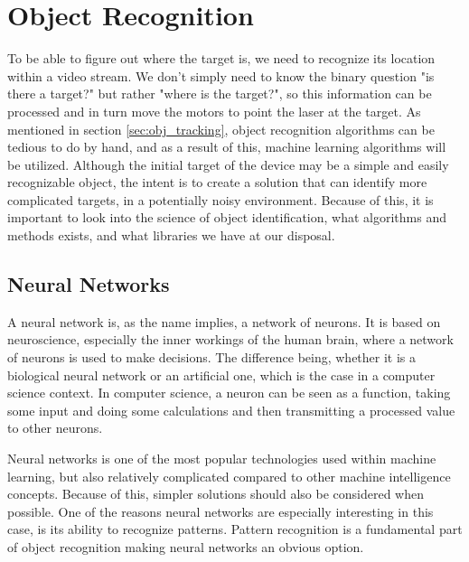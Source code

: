 \section{Object Recognition}
To be able to figure out where the target is, we need to recognize its location within a video stream.
We don't simply need to know the binary question "is there a target?" but rather "where is the target?", so this information can be processed and in turn move the motors to point the laser at the target.
As mentioned in section \ref{sec:obj_tracking}, object recognition algorithms can be tedious to do by hand, and as a result of this, machine learning algorithms will be utilized.
Although the initial target of the device may be a simple and easily recognizable object, the intent is to create a solution that can identify more complicated targets, in a potentially noisy environment.
Because of this, it is important to look into the science of object identification, what algorithms and methods exists, and what libraries we have at our disposal.




\subsection{Neural Networks}

A neural network is, as the name implies, a network of neurons.
It is based on neuroscience, especially the inner workings of the human brain, where a network of neurons is used to make decisions.
The difference being, whether it is a biological neural network or an artificial one, which is the case in a computer science context.
In computer science, a neuron can be seen as a function, taking some input and doing some calculations and then transmitting a processed value to other neurons.

Neural networks is one of the most popular technologies used within machine learning, but also relatively complicated compared to other machine intelligence concepts.
Because of this, simpler solutions should also be considered when possible.
One of the reasons neural networks are especially interesting in this case, is its ability to recognize patterns.
Pattern recognition is a fundamental part of object recognition making neural networks an obvious option.

